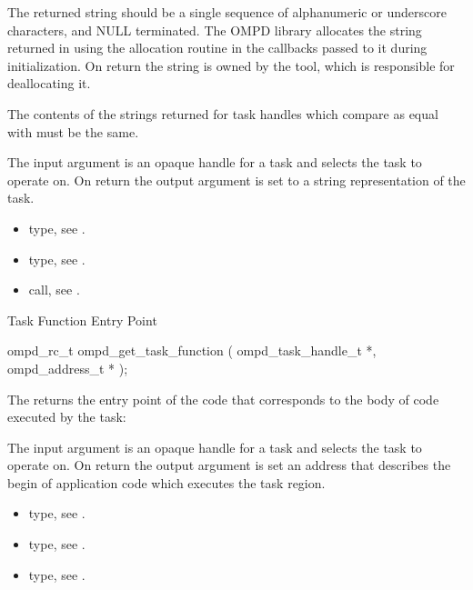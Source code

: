 \descr
The returned string should be a single sequence of alphanumeric or underscore characters, and
NULL terminated. The OMPD library allocates the string returned in 
using the allocation routine in the callbacks passed to it during initialization. On return the string is
owned by the tool, which is responsible for deallocating it.

The contents of the strings returned for task handles which compare as equal with
 must be the same.

\argdesc
The input argument  is an opaque handle for a task and selects the task to operate on.
On return the output argument  is set to a string representation of the task.

\crossreferences
\begin{itemize}
  \item {} type, see .
	\item {} type, see .
	\item {} call, see .
\end{itemize}


\label{subsubsubsec:ompd_get_task_function}
\summary
Task Function Entry Point
\format
\begin{cspecific}
\begin{ompSyntax}
ompd_rc_t ompd_get_task_function (
  ompd_task_handle_t *,
  ompd_address_t *
);
\end{ompSyntax}
\end{cspecific}

\descr
The  returns the entry point of the code
that corresponds to the body of code executed by the task:

\argdesc
The input argument  is an opaque handle for a task and selects the task to operate on.
On return the output argument  is set an address that describes the begin of application
code which executes the task region.

\crossreferences
\begin{itemize}
  \item {} type, see .
	\item {} type, see .
	\item {} type, see .
\end{itemize}


